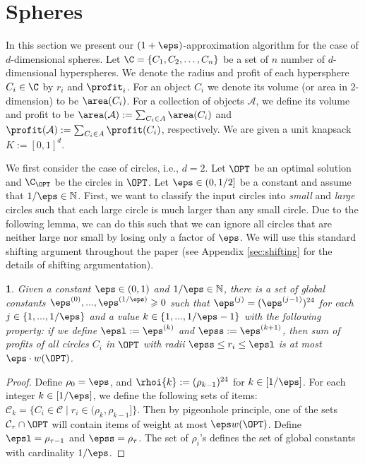 \documentclass[10pt,a4paper]{article}
\theoremstyle{plain}
\theoremstyle{plain}
\newtheorem{lem}[theorem]{\protect\lemmaname}
\theoremstyle{plain}
\theoremstyle{definition}
\providecommand{\lemmaname}{Lemma}
\begin{document}
{\section{Spheres}
\label{sec:spheres}
In this section we present our $(1+\eps)$-approximation algorithm
for the case of $d$-dimensional spheres.
Let $\C = \{ C_1, C_2, \dots , C_n \}$ be a set of  $n$ number of $d$-dimensional hyperspheres. We denote the radius and profit of each hypersphere \(C_i \in \C\) by \(r_i\) and \(\profit_i\). 
For an object $C_i$ we denote its volume (or area in 2-dimension) to be $\area(C_i)$. 
For a collection of objects $\mathcal{A}$, we define its volume and profit to be $\area(\mathcal{A}):=\sum_{C_i \in A} \area(C_i)$ and $\profit(\mathcal{A}):=\sum_{C_i \in A} \profit(C_i)$, respectively.
We are given a unit knapsack $K := [0,1]^d$. 




We first consider the case of circles, i.e., $d=2$.
Let $\OPT$ be an optimal solution and $\C_{\OPT}$ be the circles in $\OPT$.
Let $\eps \in (0,1/2]$ be a constant and assume that $1/\eps\in\mathbb{N}$. First,
we want to classify the input circles into \emph{small} and \emph{large
}circles such that each large circle is much larger than any small circle.
Due to the following lemma, we can do this such that we can ignore
all circles that are neither large nor small by losing only a factor
of $\eps$. 
We will use this standard shifting argument throughout the paper (see Appendix \ref{sec:shifting} for the details of shifting argumentation). 

\begin{lem}
\label{lem:create-gap} Given a constant $\eps\in (0,1)$ and $1/\eps \in \mathbb{N}$, there is a
	set of global constants $\eps^{(0)},...,\eps^{(1/\eps)}\geqslant 0$ such that
	$\eps^{(j)}=(\eps^{(j-1)})^{24}$ for each $j\in\{1,...,{1/\eps}\}$
	and a value $k\in\{1,...,{1/\eps}-1\}$ with the following property: if we define
	$\epsl:=\eps^{(k)}$ and $\epss:=\eps^{(k+1)}$, 
	then sum of profits of all circles $C_i$ in $\OPT$ with radii $\epss \leq r_i \leq \epsl$ is at most $\eps \cdot w(\OPT)$.
\end{lem}

\begin{proof}
Define $\rho_0=\eps$, and $\rhoi{k} := (\rho_{k-1})^{24}$ for $k \in [1/\eps]$. For each integer $k \in [1/\eps]$,  we define the following sets of items:
$\mathcal{C}_k = \{C_i \in \mathcal{C} \mid r_{i} \in (\rho_{k},\rho_{k-1}]\}$.
Then by pigeonhole principle, one of the sets $\mathcal{C}_{\tau} \cap \OPT$ will contain items of weight at most $\eps w(\OPT)$.
Define $\epsl=\rho_{\tau-1}$ and $\epss=\rho_{\tau}$. The set of $\rho_i$'s defines the set of global constants with cardinality $1/\eps$. 
\end{proof}




}
\end{document}
